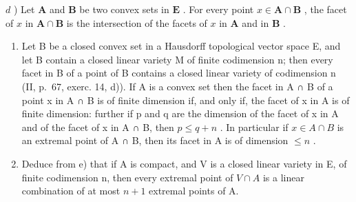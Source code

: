 \(d\) ) Let \(\mathbf{A}\) and \(\mathbf{B}\) be two convex sets in \(\mathbf{E}\) . For every point \(x\in \mathbf{A}\cap \mathbf{B}\) , the facet of \(x\) in \(\mathbf{A}\cap \mathbf{B}\) is the intersection of the facets of \(x\) in \(\mathbf{A}\) and in \(\mathbf{B}\) .

\begin{enumerate}
\def\labelenumi{\alph{enumi})}
\setcounter{enumi}{4}
\item
  Let B be a closed convex set in a Hausdorff topological vector space E, and let B contain a closed linear variety M of finite codimension n; then every facet in B of a point of B contains a closed linear variety of codimension n (II, p.~67, exerc. 14, d)). If A is a convex set then the facet in A ∩ B of a point x in A ∩ B is of finite dimension if, and only if, the facet of x in A is of finite dimension: further if p and q are the dimension of the facet of x in A and of the facet of x in A ∩ B, then \(p \leqslant q + n\) . In particular if \(x \in A \cap B\) is an extremal point of A ∩ B, then its facet in A is of dimension \(\leqslant n\) .
\item
  Deduce from e) that if A is compact, and V is a closed linear variety in E, of finite codimension n, then every extremal point of \(V \cap A\) is a linear combination of at most \(n + 1\) extremal points of A.
\end{enumerate}

